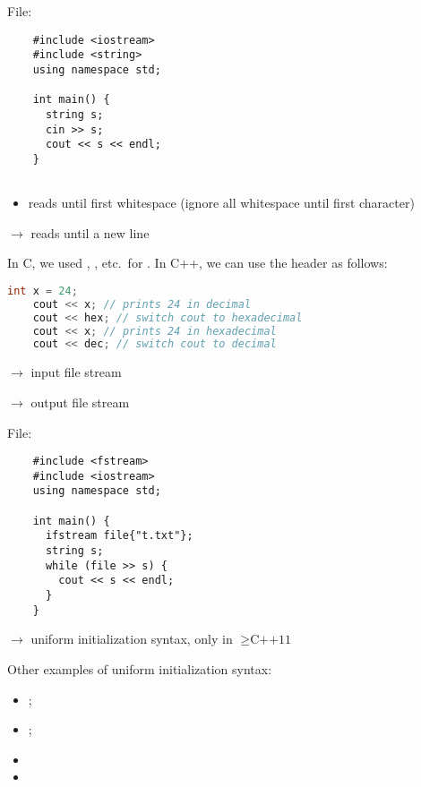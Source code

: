 File: 

\begin{lstlisting}
    #include <iostream>
    #include <string>
    using namespace std;
    
    int main() {
      string s;
      cin >> s;
      cout << s << endl;
    }    
    
\end{lstlisting}

\begin{itemize}
      \item reads until first whitespace (ignore all whitespace until first
            character)
\end{itemize}
 $ \rightarrow $ reads until a new line

In C, we used , , etc.\ for . In C++, we
can use the  header as follows:
\begin{lstlisting}[language = C++]
    int x = 24;
    cout << x; // prints 24 in decimal
    cout << hex; // switch cout to hexadecimal
    cout << x; // prints 24 in hexadecimal
    cout << dec; // switch cout to decimal
\end{lstlisting}

 $ \rightarrow $ input file stream

 $ \rightarrow $ output file stream

File: 
\begin{lstlisting}
    #include <fstream>
    #include <iostream>
    using namespace std;
    
    int main() {
      ifstream file{"t.txt"};
      string s;
      while (file >> s) {
        cout << s << endl;
      }
    }    
\end{lstlisting}
$ \rightarrow $ uniform initialization syntax, only in $ \geqslant\text{C++11} $

Other examples of uniform initialization syntax:
\begin{itemize}
      \item {};
      \item {};
\end{itemize}

\begin{itemize}
      \item {}
      \item {}
\end{itemize}

